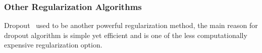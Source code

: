 \subsubsection{Other Regularization Algorithms}

Dropout~\cite{JMLR:v15:srivastava14a} used to be another powerful regularization method, the main reason for dropout algorithm is simple yet efficient and is one of the less computationally expensive regularization option. 
